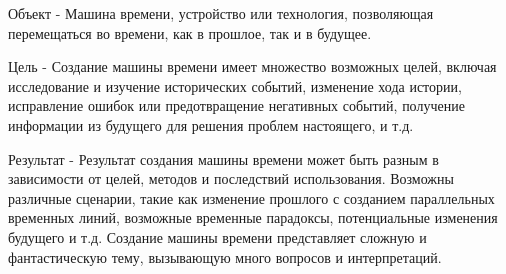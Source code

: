 Объект - Машина времени, устройство или технология, позволяющая перемещаться во времени, как в прошлое, так и в будущее.

Цель - Создание машины времени имеет множество возможных целей, включая исследование и изучение исторических событий, изменение хода истории, исправление ошибок или предотвращение негативных событий, получение информации из будущего для решения проблем настоящего, и т.д.

Результат - Результат создания машины времени может быть разным в зависимости от целей, методов и последствий использования. Возможны различные сценарии, такие как изменение прошлого с созданием параллельных временных линий, возможные временные парадоксы, потенциальные изменения будущего и т.д. Создание машины времени представляет сложную и фантастическую тему, вызывающую много вопросов и интерпретаций.
